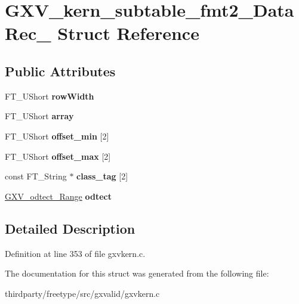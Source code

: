 \hypertarget{struct_g_x_v__kern__subtable__fmt2___data_rec__}{}\section{G\+X\+V\+\_\+kern\+\_\+subtable\+\_\+fmt2\+\_\+\+Data\+Rec\+\_\+ Struct Reference}
\label{struct_g_x_v__kern__subtable__fmt2___data_rec__}
\subsection*{Public Attributes}
\begin{DoxyCompactItemize}
\item 
\mbox{\label{struct_g_x_v__kern__subtable__fmt2___data_rec___acce05164fe0ae377307c75e485aa8c82}} 
F\+T\+\_\+\+U\+Short {\bfseries row\+Width}
\item 
\mbox{\label{struct_g_x_v__kern__subtable__fmt2___data_rec___af95024ab7bb1ac4d7d45d5a66a6f0c39}} 
F\+T\+\_\+\+U\+Short {\bfseries array}
\item 
\mbox{\label{struct_g_x_v__kern__subtable__fmt2___data_rec___a2b54c8210729a95fefd24e767fab709a}} 
F\+T\+\_\+\+U\+Short {\bfseries offset\+\_\+min} \mbox{[}2\mbox{]}
\item 
\mbox{\label{struct_g_x_v__kern__subtable__fmt2___data_rec___a91d151bb536c13eb9fe39f0283a59515}} 
F\+T\+\_\+\+U\+Short {\bfseries offset\+\_\+max} \mbox{[}2\mbox{]}
\item 
\mbox{\label{struct_g_x_v__kern__subtable__fmt2___data_rec___aa41296c81730ba3ad8a4a988831aa7bb}} 
const F\+T\+\_\+\+String $\ast$ {\bfseries class\+\_\+tag} \mbox{[}2\mbox{]}
\item 
\mbox{\label{struct_g_x_v__kern__subtable__fmt2___data_rec___a0760c0a483e4f436015fd984305c986e}} 
\hyperlink{struct_g_x_v__odtect___range_rec__}{G\+X\+V\+\_\+odtect\+\_\+\+Range} {\bfseries odtect}
\end{DoxyCompactItemize}


\subsection{Detailed Description}


Definition at line 353 of file gxvkern.\+c.



The documentation for this struct was generated from the following file\+:\begin{DoxyCompactItemize}
\item 
thirdparty/freetype/src/gxvalid/gxvkern.\+c\end{DoxyCompactItemize}
